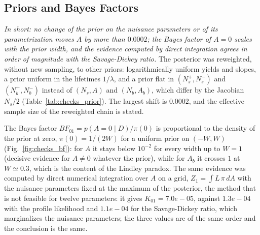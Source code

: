 \subsection{Priors and Bayes Factors}
\label{sec:checks_prior}
\emph{In short: no change of the prior on the nuisance parameters or of its parametrization moves $A$ by more than $0.0002$; the Bayes factor of $A=0$ scales with the prior width, and the evidence computed by direct integration agrees in order of magnitude with the Savage-Dickey ratio.}
The posterior was reweighted, without new sampling, to other priors: logarithmically uniform yields and slopes, a prior uniform in the lifetimes $1/\lambda$, and a prior flat in $(N_s^+,N_s^-)$ and $(N_b^+,N_b^-)$ instead of $(N_s,A)$ and $(N_b,A_b)$, which differ by the Jacobian $N_s/2$ (Table~\ref{tab:checks_prior}). The largest shift is $0.0002$, and the effective sample size of the reweighted chain is stated.

\begin{table}[h]
\centering
{}
\caption{Posterior of $A$ under alternative priors, by importance reweighting of the chain; ESS: effective sample size of the $20{,}000$ thinned samples.}
\label{tab:checks_prior}
\end{table}

The Bayes factor $BF_{01}=p(A=0\mid D)/\pi(0)$ is proportional to the density of the prior at zero, $\pi(0)=1/(2W)$ for a uniform prior on $(-W,W)$ (Fig.~\ref{fig:checks_bf}): for $A$ it stays below $10^{-2}$ for every width up to $W=1$ (decisive evidence for $A\neq0$ whatever the prior), while for $A_b$ it crosses $1$ at $W\simeq0.3$, which is the content of the Lindley paradox. The same evidence was computed by direct numerical integration over $A$ on a grid, $Z_1=\int L\,\pi\,dA$ with the nuisance parameters fixed at the maximum of the posterior, the method that is not feasible for twelve parameters: it gives $K_{01}=7.0e-05$, against $1.3e-04$ with the profile likelihood and $1.1e-04$ for the Savage-Dickey ratio, which marginalizes the nuisance parameters; the three values are of the same order and the conclusion is the same.


